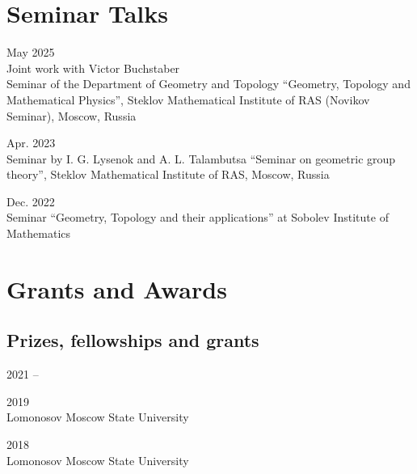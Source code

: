 \documentclass[11pt,letterpaper]{report}
\begin{document}
    
    
    
    
    \section*{Seminar Talks}
      
      \begin{tablist}
      
      \item{May 2025} \\ Joint work with Victor Buchstaber\\ Seminar of the Department of Geometry and Topology ``Geometry, Topology and Mathematical Physics'', Steklov Mathematical Institute of RAS (Novikov Seminar), Moscow, Russia
      
       \item{Apr. 2023} \\ Seminar by I. G. Lysenok and A. L. Talambutsa ``Seminar on geometric group theory'', Steklov Mathematical Institute of RAS, Moscow, Russia
       
       \item{Dec. 2022} \\ Seminar ``Geometry, Topology and their applications'' at Sobolev Institute of Mathematics
       
      
    \end{tablist}

    
    
    
    
     \section*{Grants and Awards}

    \subsection*{Prizes, fellowships and grants}

    \begin{tablist}

        \item[2021 --]  
        \item[2019] \\ Lomonosov Moscow State University
        \item[2018] \\ Lomonosov Moscow State University

    \end{tablist}
\end{document}
